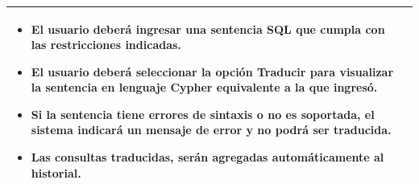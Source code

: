 \begin{longtable}[c]{|m{}|m{}|}
{\begin{itemize}[nosep, leftmargin=0.75cm, after=\vspace{0.5em}]
            \item El usuario deberá ingresar una sentencia SQL que cumpla con las restricciones indicadas.
            \item El usuario deberá seleccionar la opción \textbf{Traducir} para visualizar la sentencia en lenguaje Cypher equivalente a la que ingresó.
            \item Si la sentencia tiene errores de sintaxis o no es soportada, el sistema indicará un mensaje de error y no podrá ser traducida.
            \item Las consultas traducidas, serán agregadas automáticamente al historial.
        \end{itemize}} \\
    \hline
\end{longtable}